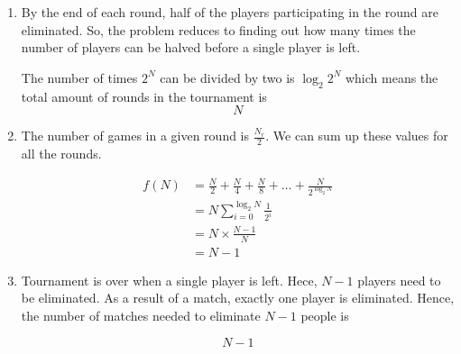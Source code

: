 \begin{enumerate}[label=(\alph*)]
\item By the end of each round, half of the players participating in the round 
are eliminated. So, the problem reduces to finding out how many times the number 
of players can be halved before a single player is left.

  The number of times $2^N$ can be divided by two is $\log_{2}{2^N}$ which means the total amount of rounds in the tournament is $$ N $$

\item The number of games in a given round is $\frac{N_{r}}{2}$. We can sum up 
these values for all the rounds.

  \begin{equation} 
  \begin{split}
   f(N) & = \frac{N}{2} + \frac{N}{4}  + \frac{N}{8} + \dots + \frac{N}{2^{\log_{2}{N}}}\\
   & =N \sum_{i=0}^{\log_{2}{N}} \frac{1}{2^{i}}\\
   & =N \times \frac{N-1}{N}\\
   & =N-1
  \end{split}
  \end{equation} 

\item Tournament is over when a single player is left. Hece, $N-1$ players 
need to be eliminated. As a result of a match, exactly one player is eliminated. 
Hence, the number of matches needed to eliminate $N-1$ people is

  $$ N-1 $$
\end{enumerate}